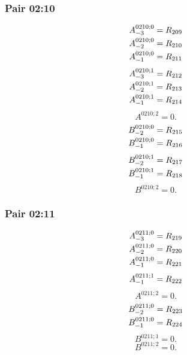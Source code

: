 \documentclass[11pt,a4paper]{article}
\begin{document}
\subsubsection{Pair 02:10}
\begin{equation}
\shortstack[l]{$\displaystyle A^{0210;0}_{-3}=R_{209}$\\
$\displaystyle A^{0210;0}_{-2}=R_{210}$\\
$\displaystyle A^{0210;0}_{-1}=R_{211}$}
\label{eq:cat-map-180}
\end{equation}
\begin{equation}
\shortstack[l]{$\displaystyle A^{0210;1}_{-3}=R_{212}$\\
$\displaystyle A^{0210;1}_{-2}=R_{213}$\\
$\displaystyle A^{0210;1}_{-1}=R_{214}$}
\label{eq:cat-map-181}
\end{equation}
\begin{equation}
A^{0210;2}=0.
\label{eq:cat-map-182}
\end{equation}
\begin{equation}
\shortstack[l]{$\displaystyle B^{0210;0}_{-2}=R_{215}$\\
$\displaystyle B^{0210;0}_{-1}=R_{216}$}
\label{eq:cat-map-183}
\end{equation}
\begin{equation}
\shortstack[l]{$\displaystyle B^{0210;1}_{-2}=R_{217}$\\
$\displaystyle B^{0210;1}_{-1}=R_{218}$}
\label{eq:cat-map-184}
\end{equation}
\begin{equation}
B^{0210;2}=0.
\label{eq:cat-map-185}
\end{equation}
\subsubsection{Pair 02:11}
\begin{equation}
\shortstack[l]{$\displaystyle A^{0211;0}_{-3}=R_{219}$\\
$\displaystyle A^{0211;0}_{-2}=R_{220}$\\
$\displaystyle A^{0211;0}_{-1}=R_{221}$}
\label{eq:cat-map-186}
\end{equation}
\begin{equation}
\shortstack[l]{$\displaystyle A^{0211;1}_{-1}=R_{222}$}
\label{eq:cat-map-187}
\end{equation}
\begin{equation}
A^{0211;2}=0.
\label{eq:cat-map-188}
\end{equation}
\begin{equation}
\shortstack[l]{$\displaystyle B^{0211;0}_{-2}=R_{223}$\\
$\displaystyle B^{0211;0}_{-1}=R_{224}$}
\label{eq:cat-map-189}
\end{equation}
\begin{equation}
B^{0211;1}=0.
\label{eq:cat-map-190}
\end{equation}
\begin{equation}
B^{0211;2}=0.
\label{eq:cat-map-191}
\end{equation}
\end{document}
